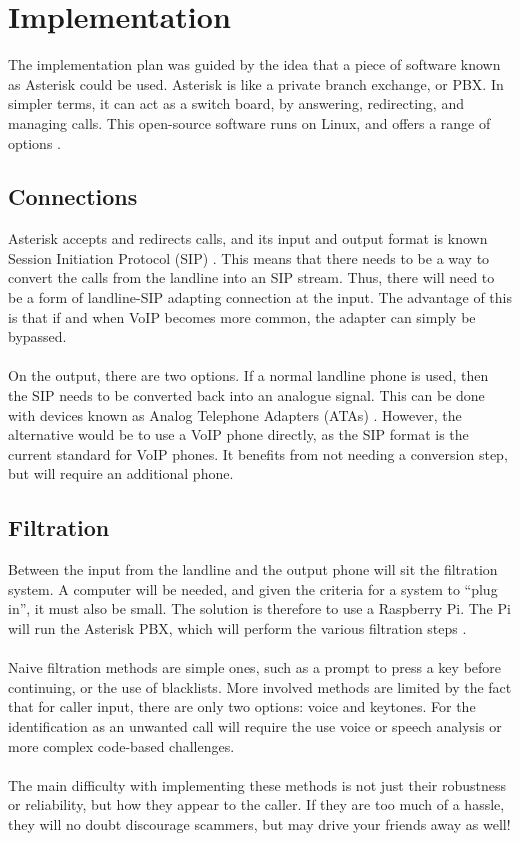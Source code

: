 \documentclass[main.tex]{subfiles}
\begin{document}
\section{Implementation}
The implementation plan was guided by the idea that a piece of software known as Asterisk could be used. Asterisk is like a private branch exchange, or PBX. In simpler terms, it can act as a switch board, by answering, redirecting, and managing calls. This open-source software runs on Linux, and offers a range of options \cite{asterisk}.

\subsection{Connections}
Asterisk accepts and redirects calls, and its input and output format is known Session Initiation Protocol (SIP) \cite{sip}. This means that there needs to be a way to convert the calls from the landline into an SIP stream. Thus, there will need to be a form of landline-SIP adapting connection at the input. The advantage of this is that if and when VoIP becomes more common, the adapter can simply be bypassed.
\\\\
On the output, there are two options. If a normal landline phone is used, then the SIP needs to be converted back into an analogue signal. This can be done with devices known as Analog Telephone Adapters (ATAs) \cite{ata}. However, the alternative would be to use a VoIP phone directly, as the SIP format is the current standard for VoIP phones. It benefits from not needing a conversion step, but will require an additional phone.

\subsection{Filtration}
Between the input from the landline and the output phone will sit the filtration system. A computer will be needed, and given the criteria for a system to ``plug in'', it must also be small. The solution is therefore to use a Raspberry Pi. The Pi will run the Asterisk PBX, which will perform the various filtration steps \cite{raspbx}.
\\\\
Naive filtration methods are simple ones, such as a prompt to press a key before continuing, or the use of blacklists. More involved methods are limited by the fact that for caller input, there are only two options: voice and keytones. For the identification as an unwanted call will require the use voice or speech analysis or more complex code-based challenges.
\\\\
The main difficulty with implementing these methods is not just their robustness or reliability, but how they appear to the caller. If they are too much of a hassle, they will no doubt discourage scammers, but may drive your friends away as well!
\end{document}
